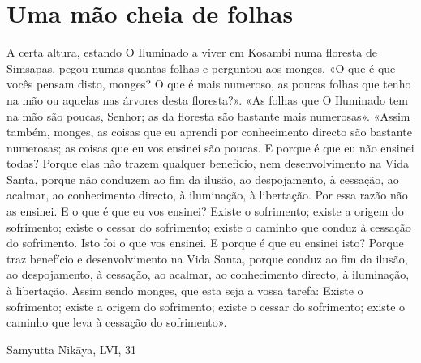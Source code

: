 \chapter{Uma mão cheia de folhas}

A certa altura, estando O Iluminado a viver em Kosambi
numa floresta de Simsapās, pegou numas quantas folhas e
perguntou aos monges, «O que é que vocês pensam disto,
monges? O que é mais numeroso, as poucas folhas que tenho
na mão ou aquelas nas árvores desta floresta?».
«As folhas que O Iluminado tem na mão são poucas,
Senhor; as da floresta são bastante mais numerosas».
«Assim também, monges, as coisas que eu aprendi por
conhecimento directo são bastante numerosas; as coisas que
eu vos ensinei são poucas.
E porque é que eu não ensinei todas? Porque elas não
trazem qualquer benefício, nem desenvolvimento na Vida
Santa, porque não conduzem ao fim da ilusão, ao despojamento, à cessação, ao acalmar, ao conhecimento directo, à iluminação, à libertação. Por essa razão não as
ensinei.
E o que é que eu vos ensinei? Existe o sofrimento;
existe a origem do sofrimento; existe o cessar do sofrimento;
existe o caminho que conduz à cessação do sofrimento. Isto
foi o que vos ensinei. E porque é que eu ensinei isto?
Porque traz benefício e desenvolvimento na Vida Santa,
porque conduz ao fim da ilusão, ao despojamento, à cessação, ao acalmar, ao conhecimento directo, à iluminação,
à libertação. Assim sendo monges, que esta seja a vossa
tarefa: Existe o sofrimento; existe a origem do sofrimento;
existe o cessar do sofrimento; existe o caminho que leva à
cessação do sofrimento».

Samyutta Nikāya, LVI, 31

